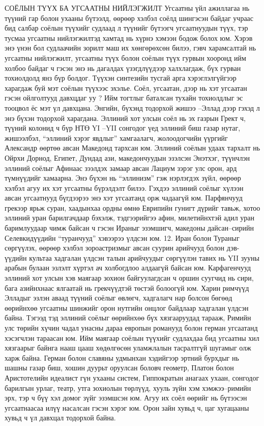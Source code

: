 СОЁЛЫН ТҮҮХ БА УГСААТНЫ НИЙЛЭГЖИЛТ
Угсаатны үйл ажиллагаа нь түүний гар болон ухааны бүтээлд, өөрөөр хэлбэл соёлд шингэсэн байдаг учраас бид салбар соёлын түүхийг судлаад л түүнийг бүтээгч угсаатнуудын түүх, тэр тусмаа угсаатны нийлэгжилтэд хамтад нь хүрнэ хэмээн бодож болох юм.
Хэрэв энэ үнэн бол судлаачийн зорилт маш их хөнгөрөхсөн билээ, гэвч харамсалтай нь угсаатны нийлэгжилт, угсаатны түүх болон соёлын түүх гурвын хооронд ийм холбоо байдаг ч гэсэн энэ нь дагалдах үзэгдлүүдээр халхлагдаж, бүх гурван тохиолдолд янз бүр болдог. Түүхэн синтезийн тусгай арга хэрэглэлгүйгээр харагдаж буй мэт соёлын түүхээс эхэлье.
Соёл, угсаатан, дээр нь хэт угсаатан гэсэн ойлголтууд давхцдаг уу ? Ийм тогтлыг баталсан тухайн тохиолдлыг эс тооцвол ёс мэт үл давхцана. Энгийн, бүхэнд тодорхой жишээ –Эллад дээр гэхэд л энэ бүхэн тодорхой харагдана.
Эллиний хот улсын соёл нь эх газрын Грект ч, түүний колонид ч бүр НТӨ YI –YII сонгодог үед эллиний биш газар нутаг, жишээлбэл, “эллиний хэрэг явдлыг” хамгаалагч, жолоодогчийн үүргийг Александр өөртөө авсан Македонд тархсан юм. Эллиний соёлын удаах тархалт нь Ойрхи Дорнод, Египет, Дундад ази, македончуудын эзэлсэн Энэтхэг, түүнчлэн эллиний соёлыг Афинаас зээлдэх замаар авсан Лациум зэрэг улс орон, ард түмнүүдийг хамаарна. Энэ бүхэн нь “эллинизм” гэж нэрлэгдэх зүйл, өөрөөр хэлбэл агуу их хэт угсаатны бүрэлдэлт билээ.
Гэхдээ эллиний соёлыг хүлээн авсан угсаатнууд бүгдээрээ энэ хэт угсаатанд орж чадаагүй юм. Парфянчууд грекээр ярьж суран, хаадынхаа ордны өмнө Еврипийн гунигт дүрийг тавьж, хотоо эллиний уран барилгачдаар бэхэлж, тэдгээрийгээ афин, милетийнхтэй адил уран баримлуудаар чимж байсан ч гэсэн Ираныг эзэмшигч, македоны дайсан–сирийн Селевкидүүдийн “туранчууд” хэвээрээ үлдсэн юм. 12. Иран болон Тураныг сөргүүлэх, өөрөөр хэлбэл зороастризмыг авсан суурин арийчууд болон дэв-үүдийн культаа хадгалан үлдсэн талын арийчуудыг сөргүүлэн тавих нь YII зууны арабын булаан эзлэлт хүртэл ач холбогдлоо алдаагүй байсан юм.
Карфагенчууд эллиний хот улсын хэв маягаар зохион байгуулагдсан ч оршин суугчид нь сири, бага азийнхнаас ялгаатай нь грекчүүдтэй төстэй болоогүй юм. Харин римчүүд Элладыг эзлэн аваад түүний соёлыг өвлөгч, хадгалагч нар болсон бөгөөд өөрийнхөө угсаатны шинжийг орон нутгийн онцлог байдлаар хадгалан үлдсэн байна. Тэгээд тэд эллиний соёлыг өөрийнхөө бүх хязгааруудад тарааж, Римийн улс төрийн хүчин чадал унасны дараа европын романууд болон герман угсаатанд хэсэгчлэн тараасан юм.
Ийм маягаар соёлын түүхийг судлахдаа бид угсаатны хил хязгаарыг байнга нааш цааш хөдөлгөсөн уламжлалын тасралтгүй шугамыг олж харж байна. Герман болон славяны удмынхан хэдийгээр эртний бурхдыг нь шашны газар биш, хошин дуурьт оруулсан боловч геометр, Платон болон Аристотелийн идеалист гүн ухааны систем, Гиппократын анагаах ухаан, сонгодог барилгын урлаг, театр, утга зохиолын төрлүүд, хууль зүйн хэм хэмжээ–римийн эрх, тэр ч бүү хэл домог зүйг эзэмшсэн юм. Агуу их соёл өөрийг нь бүтээсэн угсаатнаасаа илүү насалсан гэсэн хэрэг юм. Орон зайн хувьд ч, цаг хугацааны хувьд ч үл давхцал тодорхой байна.
